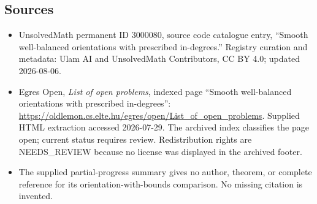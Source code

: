 \documentclass[11pt]{article}
\begin{document}
\subsection{Sources}
\begin{itemize}
\item UnsolvedMath permanent ID 3000080, source code catalogue entry, ``Smooth well-balanced orientations with prescribed in-degrees.'' Registry curation and metadata: Ulam AI and UnsolvedMath Contributors, CC BY 4.0; updated 2026-08-06.
\item Egres Open, \emph{List of open problems}, indexed page ``Smooth well-balanced orientations with prescribed in-degrees'': \url{https://oldlemon.cs.elte.hu/egres/open/List_of_open_problems}. Supplied HTML extraction accessed 2026-07-29. The archived index classifies the page open; current status requires review. Redistribution rights are NEEDS\_REVIEW because no license was displayed in the archived footer.
\item The supplied partial-progress summary gives no author, theorem, or complete reference for its orientation-with-bounds comparison. No missing citation is invented.
\end{itemize}
\end{document}
